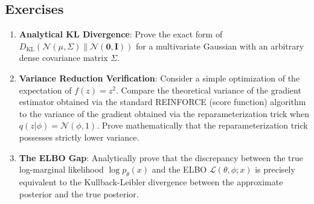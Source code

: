 \subsection{Exercises}
\begin{enumerate}
    \item \textbf{Analytical KL Divergence}: Prove the exact form of $D_{\text{KL}}(\mathcal{N}(\mu, \Sigma) \parallel \mathcal{N}(\mathbf{0}, \mathbf{I}))$ for a multivariate Gaussian with an arbitrary dense covariance matrix $\Sigma$. 
    \item \textbf{Variance Reduction Verification}: Consider a simple optimization of the expectation of $f(z) = z^2$. Compare the theoretical variance of the gradient estimator obtained via the standard REINFORCE (score function) algorithm to the variance of the gradient obtained via the reparameterization trick when $q(z|\phi) = \mathcal{N}(\phi, 1)$. Prove mathematically that the reparameterization trick possesses strictly lower variance.
    \item \textbf{The ELBO Gap}: Analytically prove that the discrepancy between the true log-marginal likelihood $\log p_\theta(x)$ and the ELBO $\mathcal{L}(\theta, \phi; x)$ is precisely equivalent to the Kullback-Leibler divergence between the approximate posterior and the true posterior. 
\end{enumerate}

